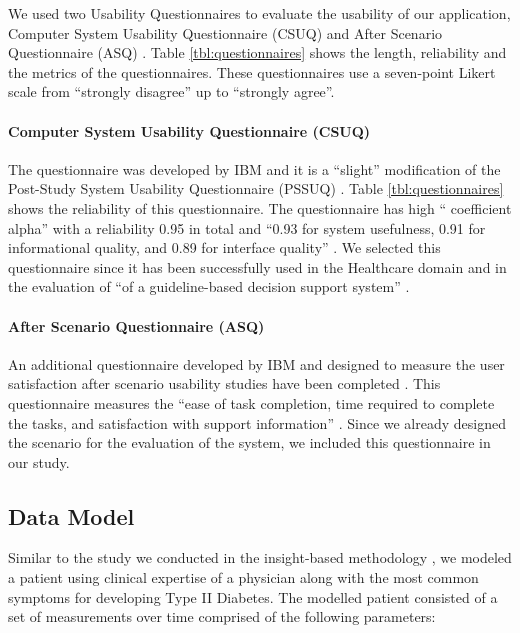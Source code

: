 \documentclass[twocolumn]{bmcart}%
\begin{document}
We used two Usability Questionnaires to evaluate the usability of our application, Computer System Usability Questionnaire (CSUQ) and After Scenario Questionnaire (ASQ) \cite{lewis1995ibm}. Table \ref{tbl:questionnaires} shows the length, reliability and the metrics of the questionnaires. These questionnaires use a seven-point Likert scale from ``strongly disagree'' up to ``strongly agree''.

\paragraph*{Computer System Usability Questionnaire (CSUQ)} The questionnaire was developed by IBM and it is a ``slight'' modification of the Post-Study System Usability Questionnaire (PSSUQ) \cite{lewis1992psychometric}. Table \ref{tbl:questionnaires} shows the reliability of this questionnaire. The questionnaire has high `` coefficient alpha'' with a reliability 0.95 in total and ``0.93 for system usefulness, 0.91 for informational quality, and 0.89 for interface quality''  \cite{johnson2011ehr, lewis1995ibm, lewis1992psychometric}. We selected this questionnaire since it has been successfully used in the Healthcare domain \cite{johnson2011ehr, jaspers2008pre} and in the evaluation of ``of a guideline-based decision support system'' \cite{johnson2011ehr, goud2008subjective}.

\paragraph*{After Scenario Questionnaire (ASQ)} An additional questionnaire developed by IBM \cite{johnson2011ehr, lewis1995ibm, lewis1991psychometric} and designed to measure the user satisfaction after scenario usability studies have been completed \cite{johnson2011ehr, lewis1992psychometric, bangor2008empirical}. This questionnaire measures the ``ease of task completion, time required to complete the tasks, and satisfaction with support information'' \cite{johnson2011ehr}. Since we already designed the scenario for the evaluation of the system, we included this questionnaire in our study.

\subsection*{Data Model}

Similar to the study we conducted in the insight-based methodology \citep{EMBCLedNiem}, we modeled a patient using clinical expertise of a physician along with the most common symptoms for developing Type II Diabetes. The modelled patient consisted of a set of measurements over time comprised of the following parameters:
\end{document}
